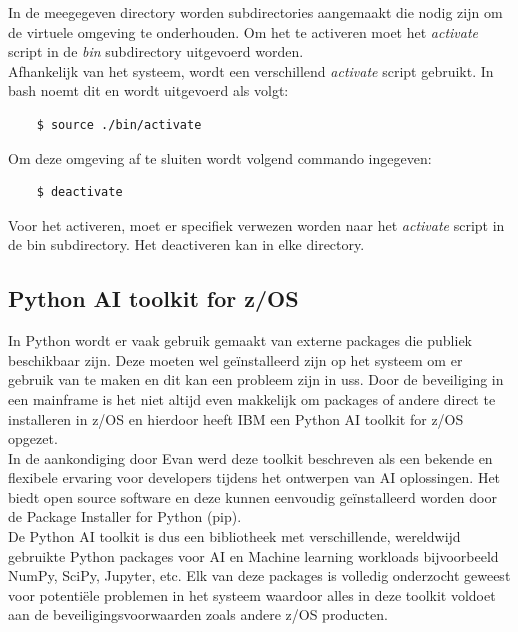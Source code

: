 In de meegegeven directory worden subdirectories aangemaakt die nodig zijn om de virtuele omgeving te onderhouden. Om het te activeren moet het \textit{activate} script in de \textit{bin} subdirectory uitgevoerd worden. \autocite{PSF2024} \\
Afhankelijk van het systeem, wordt een verschillend \textit{activate} script gebruikt. In bash noemt dit  en wordt uitgevoerd als volgt:
\begin{lstlisting}
    $ source ./bin/activate
\end{lstlisting}

Om deze omgeving af te sluiten wordt volgend commando ingegeven:
\begin{lstlisting}
    $ deactivate
\end{lstlisting}

Voor het activeren, moet er specifiek verwezen worden naar het \textit{activate} script in de bin subdirectory. Het deactiveren kan in elke directory.

\subsection{Python AI toolkit for z/OS}
In Python wordt er vaak gebruik gemaakt van externe packages die publiek beschikbaar zijn. Deze moeten wel geïnstalleerd zijn op het systeem om er gebruik van te maken en dit kan een probleem zijn in \acrshort{uss}. Door de beveiliging in een mainframe is het niet altijd even makkelijk om packages of andere direct te installeren in z/OS \autocite{IBM2021} en hierdoor heeft IBM een Python AI toolkit for z/OS opgezet. \\

In de aankondiging door Evan \textcite{Rivera2023} werd deze toolkit beschreven als een bekende en flexibele ervaring voor developers tijdens het ontwerpen van AI oplossingen. Het biedt open source software en deze kunnen eenvoudig geïnstalleerd worden door de Package Installer for Python (pip). \\

De Python AI toolkit is dus een bibliotheek met verschillende, wereldwijd gebruikte Python packages voor AI en Machine learning workloads bijvoorbeeld NumPy, SciPy, Jupyter, etc. Elk van deze packages is volledig onderzocht geweest voor potentiële problemen in het systeem waardoor alles in deze toolkit voldoet aan de beveiligingsvoorwaarden zoals andere z/OS producten. \autocite{Bostian2023}

